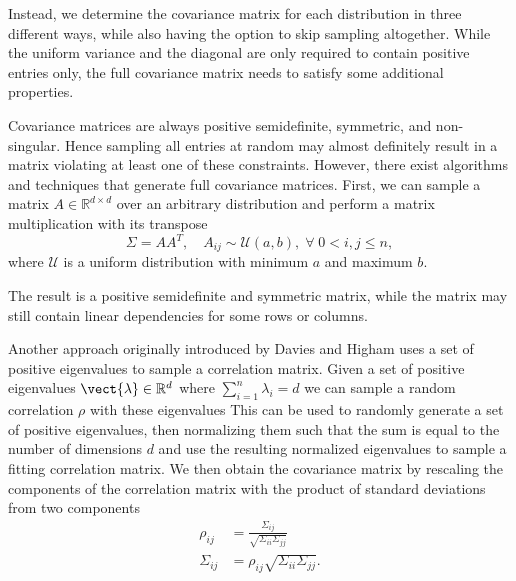 Instead, we determine the covariance matrix for each distribution in three different ways, while also having the option to skip sampling altogether.
While the uniform variance and the diagonal are only required to contain positive entries only, the full covariance matrix needs to satisfy some additional properties.

Covariance matrices are always positive semidefinite, symmetric, and non-singular. 
Hence sampling all entries at random may almost definitely result in a matrix violating at least one of these constraints.
However, there exist algorithms and techniques that generate full covariance matrices.
First, we can sample a matrix $A\in \mathbb{R}^{d \times d}$ over an arbitrary distribution and perform a matrix multiplication with its transpose
\begin{equation}
    \Sigma = AA^T, \quad A_{ij}\sim\mathcal{U}(a,b), \; \forall \;0 < i,j \leq n,
\end{equation}
where $\mathcal{U}$ is a uniform distribution with minimum $a$ and maximum $b$.

The result is a positive semidefinite and symmetric matrix, while the matrix may still contain linear dependencies for some rows or columns.

Another approach originally introduced by Davies and Higham \cite{davies2000numerically} uses a set of positive eigenvalues to sample a correlation matrix.
Given a set of positive eigenvalues $\vect{\lambda}\in \mathbb{R}^d$ where $\sum_{i=1}^n \lambda_i = d$ we can sample a random correlation $\rho$ with these eigenvalues
This can be used to randomly generate a set of positive eigenvalues, then normalizing them such that the sum is equal to the number of dimensions $d$ and use the resulting normalized eigenvalues to sample a fitting correlation matrix. 
We then obtain the covariance matrix by rescaling the components of the correlation matrix with the product of standard deviations from two components 
\begin{equation}
    \begin{split}
            \rho_{ij} &= \frac{\Sigma_{ij}}{\sqrt{\Sigma_{ii}\Sigma_{jj}}} \\
            \Sigma_{ij} &=  \rho_{ij}\sqrt{\Sigma_{ii}\Sigma_{jj}}.
    \end{split}
\end{equation}

